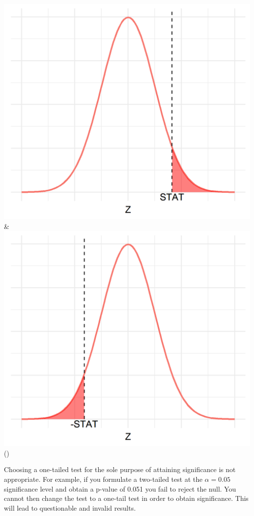 \documentclass[
  letterpaper,
  DIV=11,
  numbers=noendperiod]{scrreprt}
\theoremstyle{definition}
\theoremstyle{remark}
\begin{document}
\begin{longtable}[]
\includegraphics{images/tail_right.png} &
\includegraphics{images/tail_left.png} \\
\bottomrule()
\end{longtable}

Choosing a one-tailed test for the sole purpose of attaining
significance is not appropriate. For example, if you formulate a
two-tailed test at the \(\alpha = 0.05\) significance level and obtain a
p-value of 0.051 you fail to reject the null. You cannot then change the
test to a one-tail test in order to obtain significance. This will lead
to questionable and invalid results.
\end{document}

